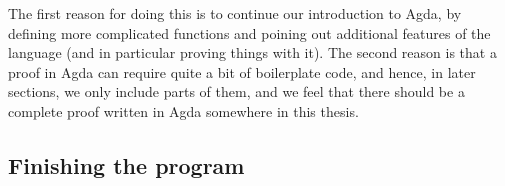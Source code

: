 The first reason for doing this is to continue our introduction to Agda, by defining more complicated functions and poining out additional features of the language (and in particular proving things with it). The second reason is that a proof in Agda can require quite a bit of boilerplate code, and hence, in later sections, we only include parts of them, and we feel that there should be a complete proof written in Agda somewhere in this thesis.


\subsection{Finishing the program}
